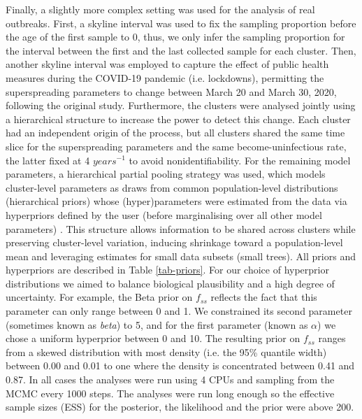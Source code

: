 \documentclass[lineno,pdflatex,sn-nature]{sn-jnl}%
\theoremstyle{thmstyleone}%
\theoremstyle{thmstyletwo}%
\theoremstyle{thmstylethree}%
\begin{document}
Finally, a slightly more complex setting was used for the analysis of real outbreaks. First, a skyline interval was used to fix the sampling proportion before the age of the first sample to 0, thus, we only infer the sampling proportion for the interval between the first and the last collected sample for each cluster. Then, another skyline interval was employed to capture the effect of public health measures during the COVID-19 pandemic (i.e. lockdowns), permitting the superspreading parameters to change between March 20 and March 30, 2020, following the original study. Furthermore, the clusters were analysed jointly using a hierarchical structure to increase the power to detect this change. Each cluster had an independent origin of the process, but all clusters shared the same time slice for the superspreading parameters and the same become-uninfectious rate, the latter fixed at 4 $years^{-1}$ to avoid nonidentifiability. For the remaining model parameters, a hierarchical partial pooling strategy was used, which models cluster-level parameters as draws from common population-level distributions (hierarchical priors) whose (hyper)parameters were estimated from the data via hyperpriors defined by the user (before marginalising over all other model parameters) \cite{jhon2024Assesing}. This structure allows information to be shared across clusters while preserving cluster-level variation, inducing shrinkage toward a population-level mean and leveraging estimates for small data subsets (small trees). All priors and hyperpriors are described in Table \ref{tab-priors}. For our choice of hyperprior distributions we aimed to balance biological plausibility and a high degree of uncertainty. For example, the Beta prior on $f_{ss}$ reflects the fact that this parameter can only range between 0 and 1. We constrained its second parameter (sometimes known as \textit{beta}) to 5, and for the first parameter (known as $\alpha$) we chose a uniform hyperprior between 0 and 10. The resulting prior on $f_{ss}$ ranges from a skewed distribution with most density (i.e. the 95\% quantile width) between 0.00 and 0.01 to one where the density is concentrated between 0.41 and 0.87. In all cases the analyses were run using 4 CPUs and sampling from the MCMC every 1000 steps. The analyses were run long enough so the effective sample sizes (ESS) for the posterior, the likelihood and the prior were above 200.
\end{document}
